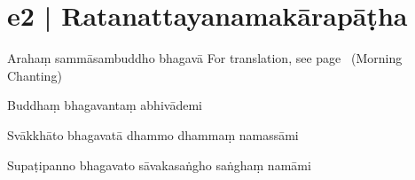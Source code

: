 
\section*{e2 | Ratanattayanamakārapāṭha}\label{sec:m02}

\begin{chantsubsection}
  \chantline
    {Arahaṃ sammāsambuddho bhagavā}
    {For translation, see page~\pageref{sec:m02} (Morning Chanting)}

  \chantonly
    {Buddhaṃ bhagavantaṃ abhivādemi}

  \chantonly
    {Svākkhāto bhagavatā dhammo dhammaṃ namassāmi}


  \chantonly
    {Supaṭipanno bhagavato sāvakasaṅgho saṅghaṃ namāmi}
    

\end{chantsubsection}
